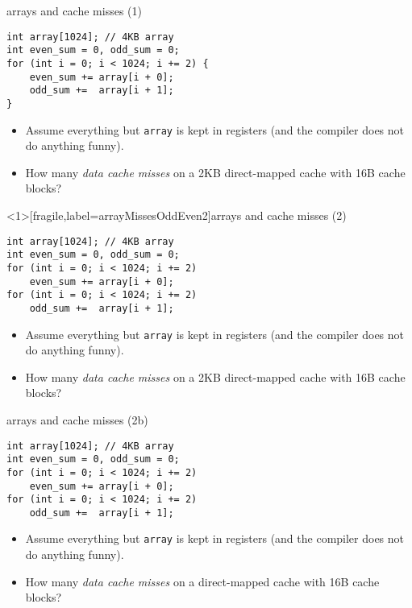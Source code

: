 \begin{frame}[fragile,label=arrayMissesOddEven1]{arrays and cache misses (1)}
\begin{lstlisting}
int array[1024]; // 4KB array
int even_sum = 0, odd_sum = 0;
for (int i = 0; i < 1024; i += 2) {
    even_sum += array[i + 0];
    odd_sum +=  array[i + 1];
}
\end{lstlisting}
    \begin{itemize}
        \item {\small
Assume everything but {\tt array} is kept in registers (and the compiler does not do
            anything funny).}
\item
How many \textit{data cache misses} on a 2KB direct-mapped cache with 16B cache blocks?
    \end{itemize}
\end{frame}

\begin{frame}<1>[fragile,label=arrayMissesOddEven2]{arrays and cache misses (2)}
\begin{lstlisting}
int array[1024]; // 4KB array
int even_sum = 0, odd_sum = 0;
for (int i = 0; i < 1024; i += 2)
    even_sum += array[i + 0];
for (int i = 0; i < 1024; i += 2)
    odd_sum +=  array[i + 1];
\end{lstlisting}
    \begin{itemize}
        \item {\small
    Assume everything but {\tt array} is kept in registers (and the compiler does not do
    anything funny).
        }
    \item
How many \textit{data cache misses} on a 2KB direct-mapped cache with 16B cache blocks?
    \end{itemize}
\end{frame}

\begin{frame}[fragile,label=arrayMissesOddEven3]{arrays and cache misses (2b)}
\begin{lstlisting}
int array[1024]; // 4KB array
int even_sum = 0, odd_sum = 0;
for (int i = 0; i < 1024; i += 2)
    even_sum += array[i + 0];
for (int i = 0; i < 1024; i += 2)
    odd_sum +=  array[i + 1];
\end{lstlisting}
    \begin{itemize}
        \item {\small
    Assume everything but {\tt array} is kept in registers (and the compiler does not do
    anything funny).
        }
    \item
        How many \textit{data cache misses} on a  direct-mapped cache with 16B cache blocks?
    \end{itemize}
\end{frame}

